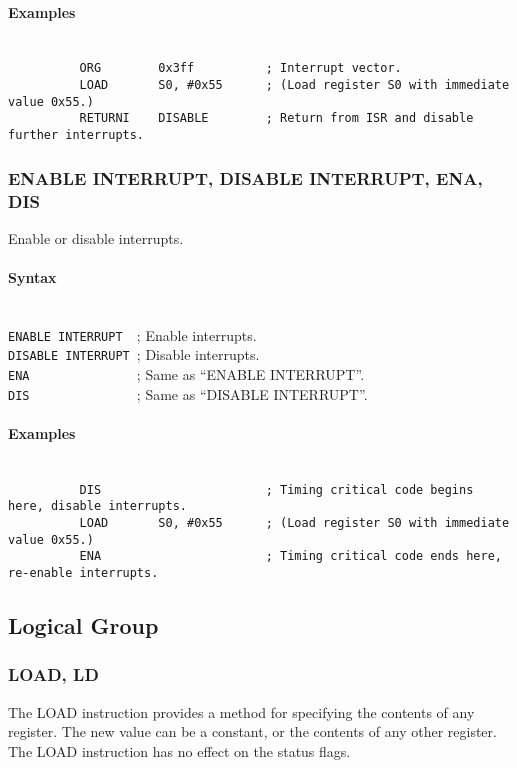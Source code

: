             \paragraph{Examples}
                ~\\
                \verb'          ORG        0x3ff          ; Interrupt vector.'\\
                \verb'          LOAD       S0, #0x55      ; (Load register S0 with immediate value 0x55.)'\\
                \verb'          RETURNI    DISABLE        ; Return from ISR and disable further interrupts.'

        \subsubsection{ENABLE INTERRUPT, DISABLE INTERRUPT, ENA, DIS}
            Enable or disable interrupts.

            \paragraph{Syntax}
                ~\\
                \verb'ENABLE INTERRUPT  '; Enable interrupts.\\
                \verb'DISABLE INTERRUPT '; Disable interrupts.\\
                \verb'ENA               '; Same as ``ENABLE INTERRUPT''.\\
                \verb'DIS               '; Same as ``DISABLE INTERRUPT''.

            \paragraph{Examples}
                ~\\
                \verb'          DIS                       ; Timing critical code begins here, disable interrupts.'\\
                \verb'          LOAD       S0, #0x55      ; (Load register S0 with immediate value 0x55.)'\\
                \verb'          ENA                       ; Timing critical code ends here, re-enable interrupts.'

    \subsection{Logical Group}
        \subsubsection{LOAD, LD}
            The LOAD instruction provides a method for specifying the contents of any register. The new value can be a constant, or the contents of any other register. The LOAD instruction has no effect on the status flags.

